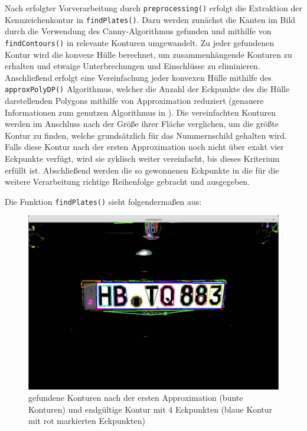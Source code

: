 \documentclass{../Vorlage/sebDenCls}
\begin{document}
Nach erfolgter Vorverarbeitung durch \texttt{preprocessing()} erfolgt die Extraktion der Kennzeichenkontur in \texttt{findPlates()}. Dazu werden zunächst die Kanten im Bild durch die Verwendung des Canny-Algorithmus gefunden und mithilfe von \texttt{findContours()} in relevante Konturen umgewandelt. Zu jeder gefundenen Kontur wird die konvexe Hülle berechnet, um zusammenhängende Konturen zu erhalten und etwaige Unterbrechungen und Einschlüsse zu eliminieren. Anschließend erfolgt eine Vereinfachung jeder konvexen Hülle mithilfe des \texttt{approxPolyDP()} Algorithmus, welcher die Anzahl der Eckpunkte des die Hülle darstellenden Polygons mithilfe von Approximation reduziert (genauere Informationen zum genutzen Algorithmus in \cite{opCV14}). Die vereinfachten Konturen werden im Anschluss nach der Größe ihrer Fläche verglichen, um die größte Kontur zu finden, welche grundsätzlich für das Nummernschild gehalten wird. Falls diese Kontur nach der ersten Approximation noch nicht über exakt vier Eckpunkte verfügt, wird sie zyklisch weiter vereinfacht, bis dieses Kriterium erfüllt ist. Abschließend werden die so gewonnenen Eckpunkte in die für die weitere Verarbeitung richtige Reihenfolge gebracht und ausgegeben.

Die Funktion \texttt{findPlates()} sieht folgendermaßen aus:\\



\begin{figure}[h]
	\centering 	
	\includegraphics[width=.75\textwidth]{beispiel_kontur} 
	\caption{gefundene Konturen nach der ersten Approximation (bunte Konturen) und endgültige Kontur mit 4 Eckpunkten (blaue Kontur mit rot markierten Eckpunkten) \label{beipsiel_kontur}}
\end{figure}
\end{document}
